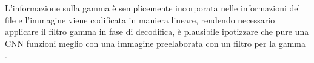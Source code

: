 L'informazione sulla gamma è semplicemente incorporata nelle informazioni del file e l'immagine viene codificata in maniera lineare, rendendo necessario applicare il filtro gamma in fase di decodifica, è plausibile ipotizzare che pure una CNN funzioni meglio con una immagine preelaborata con un filtro per la gamma \cite{gamma} \cite{gonzalez_dip}.




